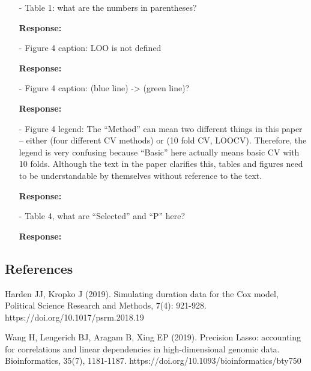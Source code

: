 \documentclass[12]{article}
\newcommand{\re}{\textbf{Response: }}
\begin{document}
\begin{enumerate}[align = left]
\begin{itemize}[align = left]
\re

\item[-]  Table 1: what are the numbers in parentheses? 

\re

\item[-] Figure 4 caption: LOO is not defined

\re

\item[-]  Figure 4 caption: (blue line) -> (green line)?

\re

\item[-]  Figure 4 legend: The “Method” can mean two different things in this paper – either (four different CV methods) or (10 fold CV, LOOCV). Therefore, the legend is very confusing because “Basic” here actually means basic CV with 10 folds. Although the text in the paper clarifies this, tables and figures need to be understandable by themselves without reference to the text.

\re

\item[-]  Table 4, what are “Selected” and “P” here?

\re

\end{itemize}
\end{enumerate}



\subsection*{References}

Harden JJ, Kropko J (2019). Simulating duration data for the Cox model, Political Science Research and Methods, 7(4): 921-928. https://doi.org/10.1017/psrm.2018.19

Wang H, Lengerich BJ, Aragam B, Xing EP (2019). Precision Lasso: accounting for correlations and linear dependencies in high-dimensional genomic data. Bioinformatics, 35(7), 1181-1187. https://doi.org/10.1093/bioinformatics/bty750
\end{document}
